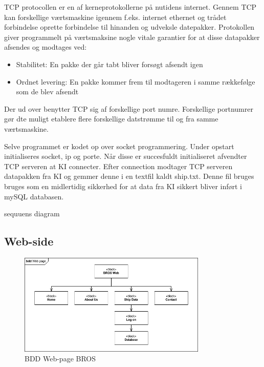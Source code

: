 TCP protocollen er en af kerneprotokollerne på nutidens internet. Gennem TCP kan forskellige værtsmaskine igennem f.eks. internet ethernet og trådet forbindelse oprette forbindelse til hinanden og udveksle datepakker. Protokollen giver programmelt på værtsmaksine nogle vitale garantier for at disse datapakker afsendes og modtages ved:
\begin{itemize}
	\item Stabilitet: En pakke der går tabt bliver forsøgt afsendt igen
	\item Ordnet levering: En pakke kommer frem til modtageren i samme rækkefølge som de blev afsendt
\end{itemize}
Der ud over benytter TCP sig af forskellige port numre. Forskellige portnumrer gør dte muligt etablere flere forskellige datstrømme til og fra samme værtsmaskine.

Selve programmet er kodet op over socket programmering. Under opstart initialiseres socket, ip og porte. Når disse er succesfuldt initialiseret afvendter TCP serveren at KI connecter. Efter connection modtager TCP serveren datapakken fra KI og gemmer denne i en textfil kaldt ship.txt. Denne fil bruges bruges som en midlertidig sikkerhed for at data fra KI sikkert bliver inført i mySQL databasen.

sequuens diagram

\subsection{Web-side}
\begin{figure}[htbp]
	\centering
	\includegraphics[width=0.8\textwidth]{billeder/bdd_web}
	\caption{BDD Web-page BROS}
	\label{fig:bdd_web}
\end{figure}

